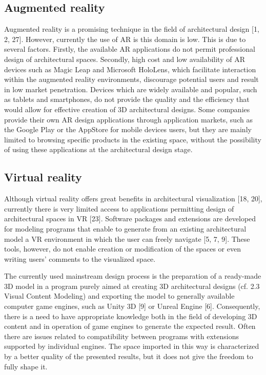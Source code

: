 \documentclass[runningheads]{llncs}
\begin{document}
\subsection{Augmented reality}
Augmented reality is a promising technique in the field of architectural design [1, 2, 27]. However, currently the use of AR is this domain is low. This is due to several factors. Firstly, the available AR applications do not permit professional design of architectural spaces. Secondly, high cost and low availability of AR devices such as Magic Leap and Microsoft HoloLens, which facilitate interaction within the augmented reality environments, discourage potential users and result in low market penetration. Devices which are widely available and popular, such as tablets and smartphones, do not provide the quality and the efficiency that would allow for effective creation of 3D architectural designs. Some companies provide their own AR design applications through application markets, such as the Google Play or the AppStore for mobile devices users, but they are mainly limited to browsing specific products in the existing space, without the possibility of using these applications at the architectural design stage.

\subsection{Virtual reality}
Although virtual reality offers great benefits in architectural visualization [18, 20], currently there is very limited access to applications permitting design of architectural spaces in VR [23]. Software packages and extensions are developed for modeling programs that enable to generate from an existing architectural model a VR environment in which the user can freely navigate [5, 7, 9]. These tools, however, do not enable creation or modification of the spaces or even writing users' comments to the visualized space. 

The currently used mainstream design process is the preparation of a ready-made 3D model in a program purely aimed at creating 3D architectural designs (cf. 2.3 Visual Content Modeling) and exporting the model to generally available computer game engines, such as Unity 3D [9] or Unreal Engine [6]. Consequently, there is a need to have appropriate knowledge both in the field of developing 3D content and in operation of game engines to generate the expected result. Often there are issues related to compatibility between programs with extensions supported by individual engines. The space imported in this way is characterized by a better quality of the presented results, but it does not give the freedom to fully shape it.
\end{document}
